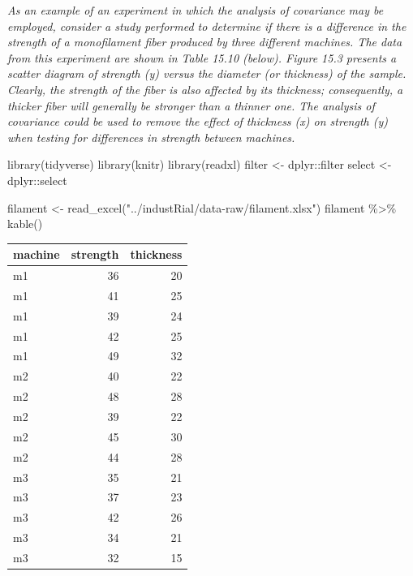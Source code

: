 \documentclass[
]{book}
\newenvironment{Shaded}{\begin{snugshade}}{\end{snugshade}}
\newcommand{\FunctionTok}[1]{\textcolor[rgb]{0.00,0.00,0.00}{#1}}
\newcommand{\NormalTok}[1]{#1}
\newcommand{\OtherTok}[1]{\textcolor[rgb]{0.56,0.35,0.01}{#1}}
\newcommand{\SpecialCharTok}[1]{\textcolor[rgb]{0.00,0.00,0.00}{#1}}
\newcommand{\StringTok}[1]{\textcolor[rgb]{0.31,0.60,0.02}{#1}}
\begin{document}
\emph{As an example of an experiment in which the analysis of covariance may be employed, consider a study performed to determine if there is a difference in the strength of a monofilament fiber produced by three different machines. The data from this experiment are shown in Table 15.10 (below). Figure 15.3 presents a scatter diagram of strength (y) versus the diameter (or thickness) of the sample. Clearly, the strength of the fiber is also affected by its thickness; consequently, a thicker fiber will generally be stronger than a thinner one. The analysis of covariance could be used to remove the effect of thickness (x) on strength (y) when testing for differences in strength between machines.}

\begin{Shaded}
\begin{Highlighting}[]
\FunctionTok{library}\NormalTok{(tidyverse)}
\FunctionTok{library}\NormalTok{(knitr)}
\FunctionTok{library}\NormalTok{(readxl)}
\NormalTok{filter }\OtherTok{\textless{}{-}}\NormalTok{ dplyr}\SpecialCharTok{::}\NormalTok{filter}
\NormalTok{select }\OtherTok{\textless{}{-}}\NormalTok{ dplyr}\SpecialCharTok{::}\NormalTok{select}
\end{Highlighting}
\end{Shaded}

\begin{Shaded}
\begin{Highlighting}[]
\NormalTok{filament }\OtherTok{\textless{}{-}} \FunctionTok{read\_excel}\NormalTok{(}\StringTok{"../industRial/data{-}raw/filament.xlsx"}\NormalTok{)}
\NormalTok{filament }\SpecialCharTok{\%\textgreater{}\%} 
  \FunctionTok{kable}\NormalTok{()}
\end{Highlighting}
\end{Shaded}

\begin{tabular}{l|r|r}
\hline
machine & strength & thickness\\
\hline
m1 & 36 & 20\\
\hline
m1 & 41 & 25\\
\hline
m1 & 39 & 24\\
\hline
m1 & 42 & 25\\
\hline
m1 & 49 & 32\\
\hline
m2 & 40 & 22\\
\hline
m2 & 48 & 28\\
\hline
m2 & 39 & 22\\
\hline
m2 & 45 & 30\\
\hline
m2 & 44 & 28\\
\hline
m3 & 35 & 21\\
\hline
m3 & 37 & 23\\
\hline
m3 & 42 & 26\\
\hline
m3 & 34 & 21\\
\hline
m3 & 32 & 15\\
\hline
\end{tabular}
\end{document}
